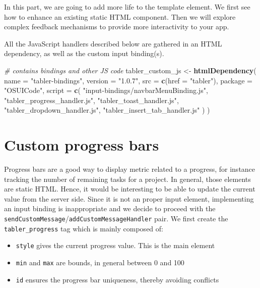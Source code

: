 \documentclass[
]{book}
\newenvironment{Shaded}{\begin{snugshade}}{\end{snugshade}}
\newcommand{\CommentTok}[1]{\textcolor[rgb]{0.56,0.35,0.01}{\textit{#1}}}
\newcommand{\DataTypeTok}[1]{\textcolor[rgb]{0.13,0.29,0.53}{#1}}
\newcommand{\KeywordTok}[1]{\textcolor[rgb]{0.13,0.29,0.53}{\textbf{#1}}}
\newcommand{\NormalTok}[1]{#1}
\newcommand{\StringTok}[1]{\textcolor[rgb]{0.31,0.60,0.02}{#1}}
\providecommand{\tightlist}{%
  \setlength{\itemsep}{0pt}\setlength{\parskip}{0pt}}
\begin{document}
In this part, we are going to add more life to the template element. We first see how to enhance an existing static HTML component. Then we will explore complex feedback mechanisms to provide more interactivity to your app.

All the JavaScript handlers described below are gathered in an HTML dependency, as well as the custom input binding(s).

\begin{Shaded}
\begin{Highlighting}[]
\CommentTok{# contains bindings and other JS code}
\NormalTok{tabler_custom_js <-}\StringTok{ }\KeywordTok{htmlDependency}\NormalTok{(}
  \DataTypeTok{name =} \StringTok{"tabler-bindings"}\NormalTok{,}
  \DataTypeTok{version =} \StringTok{"1.0.7"}\NormalTok{,}
  \DataTypeTok{src =} \KeywordTok{c}\NormalTok{(}\DataTypeTok{href =} \StringTok{"tabler"}\NormalTok{),}
  \DataTypeTok{package =} \StringTok{"OSUICode"}\NormalTok{,}
  \DataTypeTok{script =} \KeywordTok{c}\NormalTok{(}
    \StringTok{"input-bindings/navbarMenuBinding.js"}\NormalTok{,}
    \StringTok{"tabler_progress_handler.js"}\NormalTok{,}
    \StringTok{"tabler_toast_handler.js"}\NormalTok{,}
    \StringTok{"tabler_dropdown_handler.js"}\NormalTok{,}
    \StringTok{"tabler_insert_tab_handler.js"}
\NormalTok{  )}
\NormalTok{)}
\end{Highlighting}
\end{Shaded}

\hypertarget{custom-progress-bars}{%
\section{Custom progress bars}\label{custom-progress-bars}}

Progress bars are a good way to display metric related to a progress, for instance tracking the number of remaining tasks for a project. In general, those elements are static HTML. Hence, it would be interesting to be able to update the current value from the server side. Since it is not an proper input element, implementing an input binding is inappropriate and we decide to proceed with the \texttt{sendCustomMessage}/\texttt{addCustomMessageHandler} pair. We first create the \texttt{tabler\_progress} tag which is mainly composed of:

\begin{itemize}
\tightlist
\item
  \texttt{style} gives the current progress value. This is the main element
\item
  \texttt{min} and \texttt{max} are bounds, in general between 0 and 100
\item
  \texttt{id} ensures the progress bar uniqueness, thereby avoiding conflicts
\end{itemize}
\end{document}
